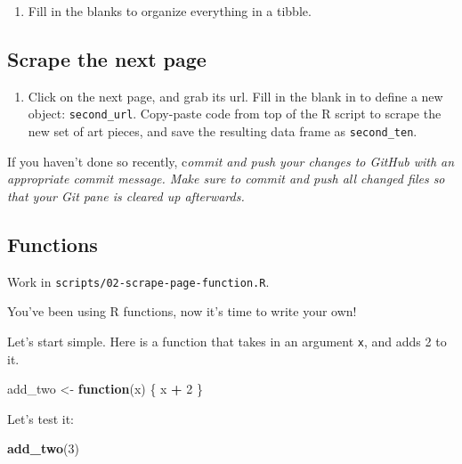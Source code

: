 \documentclass[
]{article}
\newenvironment{Shaded}{\begin{snugshade}}{\end{snugshade}}
\newcommand{\ControlFlowTok}[1]{\textcolor[rgb]{0.13,0.29,0.53}{\textbf{#1}}}
\newcommand{\DecValTok}[1]{\textcolor[rgb]{0.00,0.00,0.81}{#1}}
\newcommand{\FunctionTok}[1]{\textcolor[rgb]{0.13,0.29,0.53}{\textbf{#1}}}
\newcommand{\NormalTok}[1]{#1}
\newcommand{\OtherTok}[1]{\textcolor[rgb]{0.56,0.35,0.01}{#1}}
\newcommand{\SpecialCharTok}[1]{\textcolor[rgb]{0.81,0.36,0.00}{\textbf{#1}}}
\providecommand{\tightlist}{%
  \setlength{\itemsep}{0pt}\setlength{\parskip}{0pt}}
\begin{document}
\begin{enumerate}
\def\labelenumi{\arabic{enumi}.}
\setcounter{enumi}{2}
\tightlist
\item
  Fill in the blanks to organize everything in a tibble.
\end{enumerate}

\subsection{Scrape the next page}\label{scrape-the-next-page}

\begin{enumerate}
\def\labelenumi{\arabic{enumi}.}
\setcounter{enumi}{3}
\tightlist
\item
  Click on the next page, and grab its url. Fill in the blank in to
  define a new object: \texttt{second\_url}. Copy-paste code from top of
  the R script to scrape the new set of art pieces, and save the
  resulting data frame as \texttt{second\_ten}.
\end{enumerate}

If you haven't done so recently, c\emph{ommit and push your changes to
GitHub with an appropriate commit message. Make sure to commit and push
all changed files so that your Git pane is cleared up afterwards.}

\subsection{Functions}\label{functions}

Work in \texttt{scripts/02-scrape-page-function.R}.

You've been using R functions, now it's time to write your own!

Let's start simple. Here is a function that takes in an argument
\texttt{x}, and adds 2 to it.

\begin{Shaded}
\begin{Highlighting}[]
\NormalTok{add\_two }\OtherTok{\textless{}{-}} \ControlFlowTok{function}\NormalTok{(x) \{}
\NormalTok{  x }\SpecialCharTok{+} \DecValTok{2}
\NormalTok{\}}
\end{Highlighting}
\end{Shaded}

Let's test it:

\begin{Shaded}
\begin{Highlighting}[]
\FunctionTok{add\_two}\NormalTok{(}\DecValTok{3}\NormalTok{)}
\end{Highlighting}
\end{Shaded}
\end{document}

